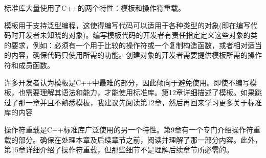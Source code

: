 
标准库大量使用了C++的两个特性：模板和操作符重载。


模板用于支持泛型编程，这使得编写代码可以适用于各种类型的对象(即在编写代码时开发者未知晓的对象)。编写模板代码的开发者有责任指定定义这些对象的类的要求，例如：必须有一个用于比较的操作符或一个复制构造函数，或者相对适当的内容，确保代码只使用所需的功能。创建对象的开发者需要提供模板所需的操作符和成员函数。

许多开发者认为模板是C++中最难的部分，因此倾向于避免使用。即使不编写模板，也需要理解其语法和能力，才能使用标准库。第12章详细描述了模板。如果跳过了那一章并且不熟悉模板，我建议先阅读第12章，然后再回来学习更多关于标准库的内容


操作符重载是C++标准库广泛使用的另一个特性。第9章有一个专门介绍操作符重载的部分。确保在处理本章及后续章节之前，阅读并理解了那一部分内容。此外，第15章详细介绍了操作符重载，但那些细节不是理解后续章节所必需的。
